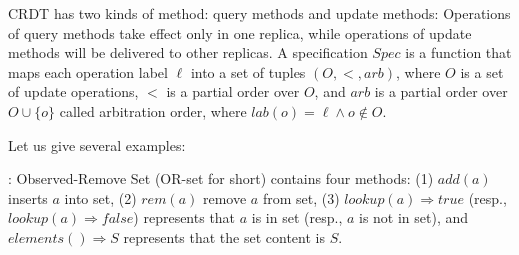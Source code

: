 CRDT has two kinds of method: query methods and update methods: Operations of query methods take effect only in one replica, while operations of update methods will be delivered to other replicas. A specification $Spec$ is a function that maps each operation label $\ell$ into a set of tuples $(O,<,arb)$, where $O$ is a set of update operations, $<$ is a partial order over $O$, and $arb$ is a partial order over $O \cup \{ o \}$ called arbitration order, where $lab(o)=\ell \wedge o \notin O$.








Let us give several examples:

: Observed-Remove Set (OR-set for short) \cite{Shapiro:2011,Bieniusa:2012} contains four methods: (1) $add(a)$ inserts $a$ into set, (2) $rem(a)$ remove $a$ from set, (3) $lookup(a)\Rightarrow \mathit{true}$ (resp., $lookup(a)\Rightarrow \mathit{false}$) represents that $a$ is in set (resp., $a$ is not in set), and $elements() \Rightarrow S$ represents that the set content is $S$.

